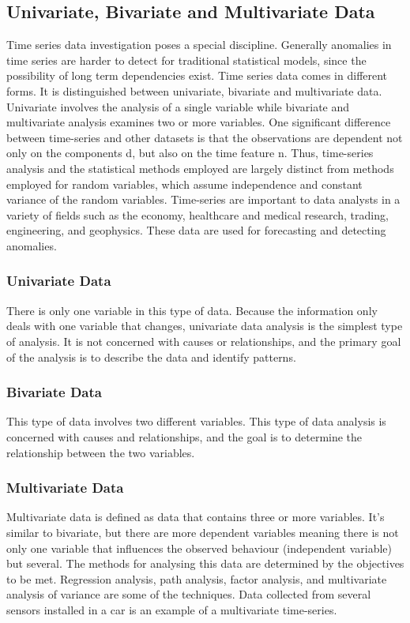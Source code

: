 \subsection{Univariate, Bivariate and Multivariate Data}
Time series data investigation poses a special discipline. Generally anomalies in time series are harder to detect for traditional statistical models, since the possibility of long term dependencies exist. Time series data comes in different forms. It is distinguished between univariate, bivariate and multivariate data. Univariate involves the analysis of a single variable while bivariate and multivariate analysis examines two or more variables. One significant difference between time-series and other datasets is that the observations are dependent not only on the components d, but also on the time feature n. Thus, time-series analysis and the statistical methods employed are largely distinct from methods employed for random variables, which assume independence and constant variance of the random variables. Time-series are important to data analysts in a variety of fields such as the economy, healthcare and medical research, trading, engineering, and geophysics. These data are used for forecasting and detecting anomalies.

\subsubsection{Univariate Data}
There is only one variable in this type of data. Because the information only deals with one variable that changes, univariate data analysis is the simplest type of analysis. It is not concerned with causes or relationships, and the primary goal of the analysis is to describe the data and identify patterns.

\subsubsection{Bivariate Data}
This type of data involves two different variables. This type of data analysis is concerned with causes and relationships, and the goal is to determine the relationship between the two variables.

\subsubsection{Multivariate Data}
Multivariate data is defined as data that contains three or more variables. It's similar to bivariate, but there are more dependent variables meaning there is not only one variable that influences the observed behaviour (independent variable) but several. The methods for analysing this data are determined by the objectives to be met. Regression analysis, path analysis, factor analysis, and multivariate analysis of variance are some of the techniques. Data collected from several sensors installed in a car is an example of a multivariate time-series.

